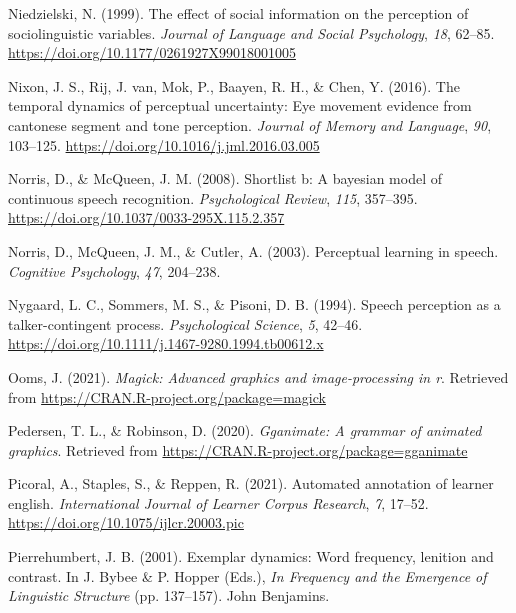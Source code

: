 \documentclass[
  11pt,
  english,
  man,floatsintext]{apa6}
\newlength{\cslhangindent}
\newlength{\cslentryspacingunit} %
\newenvironment{CSLReferences}[2] %
 {%
  \setlength{\parindent}{0pt}
  \ifodd #1
  \let\oldpar\par
  \def\par{\hangindent=\cslhangindent\oldpar}
  \fi
  \setlength{\parskip}{#2\cslentryspacingunit}
 }%
 {}
\begin{document}
\begin{CSLReferences}{1}{0}
\leavevmode{}%
Niedzielski, N. (1999). The effect of social information on the perception of sociolinguistic variables. \emph{Journal of Language and Social Psychology}, \emph{18}, 62--85. \url{https://doi.org/10.1177/0261927X99018001005}

\leavevmode{}%
Nixon, J. S., Rij, J. van, Mok, P., Baayen, R. H., \& Chen, Y. (2016). The temporal dynamics of perceptual uncertainty: Eye movement evidence from cantonese segment and tone perception. \emph{Journal of Memory and Language}, \emph{90}, 103--125. \url{https://doi.org/10.1016/j.jml.2016.03.005}

\leavevmode{}%
Norris, D., \& McQueen, J. M. (2008). Shortlist b: A bayesian model of continuous speech recognition. \emph{Psychological Review}, \emph{115}, 357--395. \url{https://doi.org/10.1037/0033-295X.115.2.357}

\leavevmode{}%
Norris, D., McQueen, J. M., \& Cutler, A. (2003). Perceptual learning in speech. \emph{Cognitive Psychology}, \emph{47}, 204--238.

\leavevmode{}%
Nygaard, L. C., Sommers, M. S., \& Pisoni, D. B. (1994). Speech perception as a talker-contingent process. \emph{Psychological Science}, \emph{5}, 42--46. \url{https://doi.org/10.1111/j.1467-9280.1994.tb00612.x}

\leavevmode{}%
Ooms, J. (2021). \emph{Magick: Advanced graphics and image-processing in r}. Retrieved from \url{https://CRAN.R-project.org/package=magick}

\leavevmode{}%
Pedersen, T. L., \& Robinson, D. (2020). \emph{Gganimate: A grammar of animated graphics}. Retrieved from \url{https://CRAN.R-project.org/package=gganimate}

\leavevmode{}%
Picoral, A., Staples, S., \& Reppen, R. (2021). Automated annotation of learner english. \emph{International Journal of Learner Corpus Research}, \emph{7}, 17--52. \url{https://doi.org/10.1075/ijlcr.20003.pic}

\leavevmode{}%
Pierrehumbert, J. B. (2001). Exemplar dynamics: Word frequency, lenition and contrast. In J. Bybee \& P. Hopper (Eds.), \emph{In Frequency and the Emergence of Linguistic Structure} (pp. 137--157). John Benjamins.


\end{CSLReferences}
\end{document}
